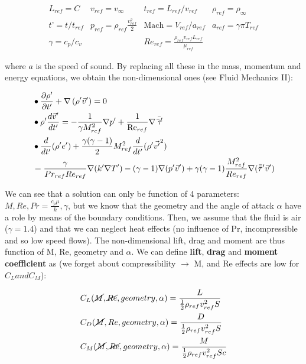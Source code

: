 \documentclass[british,french,11pt, a4paper, openany]{article}
\begin{document}
\begin{equation}
\begin{array}{cccc}
L_{ref} = C & v_{ref} = v_\infty & t_{ref} = L_{ref}/v_{ref} & \rho _{ref} = \rho _\infty \\
t’= t/t_{ref} & p_{ref} = \rho _{ref} \frac{v_{ref} ^2}{2} & \mbox{Mach} = V_{ref} / a_{ref} & a_{ref} = \gamma \pi T_{ref} \\
\gamma = c_p / c_v && Re_{ref} = \frac{\rho _{ref} v_{ref} L_{ref}}{\mu _{ref}} &
\end{array}
\end{equation}					

where $a$ is the speed of sound. By replacing all these in the mass, momentum and energy equations, we obtain the non-dimensional ones (see Fluid Mechanics II):

\begin{equation}
\begin{aligned}
&\bullet\frac{\D \rho '}{\D t'} + \nabla \left(\rho ' \vec{v}'\right) = 0\\
&\bullet\rho ' \frac{d\vec{v}'}{dt'} = - \frac{1}{\gamma M^2_{ref}}\nabla p' + \frac{1}{\mbox{Re}_{ref}}\nabla \bar{\bar{\tau}'}\\
&\bullet\frac{d}{dt'}(\rho ' e')+ \frac{\gamma (\gamma -1)}{2} M^2_{ref}\frac{d}{dt'}(\rho ' \vec{v'}^2 ) \\
&= \frac{\gamma}{Pr_{ref}Re_{ref}} \nabla (k'\nabla T') - (\gamma -1)\nabla (p'\vec{v}')+ \gamma (\gamma -1) \frac{M_{ref}^2}{Re_{ref}} \nabla (\bar{\bar{\tau}}'\vec{v}')			\end{aligned}
\end{equation}

We can see that a solution can only be function of 4 parameters: $M, Re, Pr = \frac{c_p \mu}{k}, \gamma$, but we know that the geometry and the angle of attack $\alpha$ have a role by means of the boundary conditions. Then, we assume that the fluid is air ($\gamma =1.4$) and that we can neglect heat effects (no influence of Pr, incompressible and so low speed flows). The non-dimensional lift, drag and moment are thus function of M, Re, geometry and $\alpha$. We can define \textbf{lift}, \textbf{drag} and \textbf{moment coefficient} as (we forget about compressibility $\rightarrow$ M, and Re effects are low for $C_L and C_M$): 

\begin{equation}
\begin{aligned}
&C_L(\cancel{M}, \cancel{Re}, geometry, \alpha) = \frac{L}{\frac{1}{2}\rho _{ref} v^2_{ref} S} \\
&C_D(\cancel{M},Re, geometry, \alpha) = \frac{D}{\frac{1}{2}\rho _{ref} v^2_{ref} S}		\\
&C_M(\cancel{M}, \cancel{Re}, geometry, \alpha) = \frac{M}{\frac{1}{2}\rho _{ref} v^2_{ref} Sc}
\end{aligned}	
\label{eq:2.18}		
\end{equation}
\end{document}
